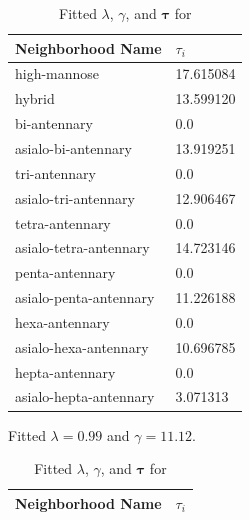     \begin{table}[!htb]
        \small
        \centering
        \begin{threeparttable}
            \caption{Fitted $\lambda$, $\gamma$, and $\mathbf{\tau}$ for
                     \philbs \label{tab:philbs_parameters}}
            \begin{tabular}{l l}
                \toprule    
                Neighborhood Name & $\tau_i$ \\
                \midrule
                high-mannose & 17.615084 \\
                hybrid & 13.599120 \\
                bi-antennary & 0.0 \\
                asialo-bi-antennary & 13.919251 \\
                tri-antennary & 0.0 \\
                asialo-tri-antennary & 12.906467 \\
                tetra-antennary & 0.0 \\
                asialo-tetra-antennary & 14.723146 \\
                penta-antennary & 0.0 \\
                asialo-penta-antennary & 11.226188 \\
                hexa-antennary & 0.0 \\
                asialo-hexa-antennary & 10.696785 \\
                hepta-antennary & 0.0 \\
                asialo-hepta-antennary & 3.071313 \\
                \bottomrule
            \end{tabular}
            \begin{tablenotes}[normal]
                \item Fitted $\lambda = 0.99$ and $\gamma = 11.12$.
            \end{tablenotes}
        \end{threeparttable}
        \hspace{1em}
        \begin{threeparttable}
            \caption{Fitted $\lambda$, $\gamma$, and $\mathbf{\tau}$ for
                     \phil \label{tab:philbs_parameters}}
            \begin{tabular}{l l}
                \toprule    
                Neighborhood Name & $\tau_i$ \\
                \midrule

\end{tabular}
\end{threeparttable}
\end{table}
